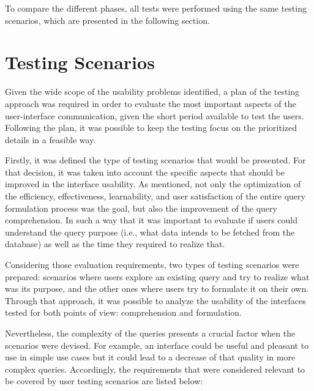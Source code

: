 To compare the different phases, all tests were performed using the same testing scenarios, which are presented in the following section.


\section{Testing Scenarios}
\label{sec:testing_scenarios}
Given the wide scope of the usability problems identified, a plan of the testing approach was required in order to evaluate the most important aspects of the user-interface communication, given the short period available to test the users. Following the plan, it was possible to keep the testing focus on the prioritized details in a feasible way.

Firstly, it was defined the type of testing scenarios that would be presented. For that decision, it was taken into account the specific aspects that should be improved in the interface usability. As mentioned, not only the optimization of the efficiency, effectiveness, learnability, and user satisfaction of the entire query formulation process was the goal, but also the improvement of the query comprehension. In such a way that it was important to evaluate if users could understand the query purpose (i.e., what data intends to be fetched from the database) as well as the time they required to realize that.

Considering those evaluation requirements, two types of testing scenarios were prepared: scenarios where users explore an existing query and try to realize what was its purpose, and the other ones where users try to formulate it on their own. Through that approach, it was possible to analyze the usability of the interfaces tested for both points of view: comprehension and formulation.

Nevertheless, the complexity of the queries presents a crucial factor when the scenarios were devised. For example, an interface could be useful and pleasant to use in simple use cases but it could lead to a decrease of that quality in more complex queries. Accordingly, the requirements that were considered relevant to be covered by user testing scenarios are listed below:

